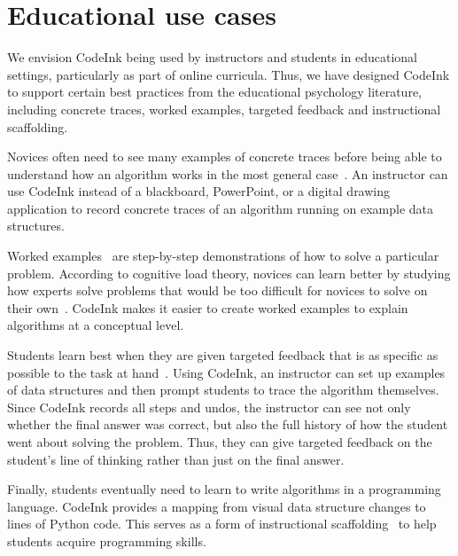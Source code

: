 \section{Educational use cases}

We envision CodeInk being used by instructors and students in educational
settings, particularly as part of online curricula. Thus, we have designed
CodeInk to support certain best practices from the educational psychology
literature, including concrete traces, worked examples, targeted feedback and
instructional scaffolding.

Novices often need to see many examples of concrete traces before being able to
understand how an algorithm works in the most general case~\cite{Detienne90}. An
instructor can use CodeInk instead of a blackboard, PowerPoint, or a digital
drawing application to record concrete traces of an algorithm running on example
data structures.


Worked examples~\cite{Sweller1985} are step-by-step demonstrations of
how to solve a particular problem. According to cognitive load theory,
novices can learn better by studying how experts solve problems that
would be too difficult for novices to solve on their
own~\cite{Linn1992}. CodeInk makes it easier to create worked examples
to explain algorithms at a conceptual level.

Students learn best when they are given targeted feedback that is
as specific as possible to the task at hand~\cite{Balzer1989}. Using
CodeInk, an instructor can set up examples of data structures and then
prompt students to trace the algorithm themselves. Since CodeInk records
all steps and undos, the instructor can see not only whether the final
answer was correct, but also the full history of how the student went
about solving the problem. Thus, they can give targeted feedback on the
student's line of thinking rather than just on the final answer.

Finally, students eventually need to learn to write algorithms in a programming
language. CodeInk provides a mapping from visual data structure changes to lines
of Python code. This serves as a form of instructional
scaffolding~\cite{Pea2004} to help students acquire programming skills.



